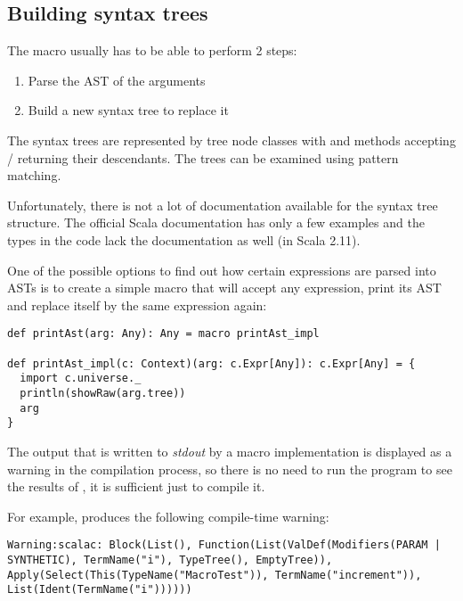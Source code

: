 \subsection{Building syntax trees}
\label{subsec:buildingast}

The macro usually has to be able to perform 2 steps:

\begin{enumerate}
	\item Parse the AST of the arguments
	\item Build a new syntax tree to replace it
\end{enumerate}

The syntax trees are represented by tree node classes with  and  methods accepting / returning their descendants. The trees can be examined using pattern matching.

Unfortunately, there is not a lot of documentation available for the syntax tree structure. The official Scala documentation has only a few examples and the types in the code lack the documentation as well (in Scala 2.11). 


One of the possible options to find out how certain expressions are parsed into ASTs is to create a simple macro that will accept any expression, print its AST and replace itself by the same expression again:

\lstset{style=Scala}
\begin{lstlisting}
def printAst(arg: Any): Any = macro printAst_impl

def printAst_impl(c: Context)(arg: c.Expr[Any]): c.Expr[Any] = {
  import c.universe._
  println(showRaw(arg.tree))
  arg
}
\end{lstlisting}

The output that is written to \textit{stdout} by a macro implementation is displayed as a warning in the compilation process, so there is no need to run the program to see the results of , it is sufficient just to compile it.

For example,  produces the following compile-time warning:

\lstset{style=Dump}
\begin{lstlisting}
Warning:scalac: Block(List(), Function(List(ValDef(Modifiers(PARAM | SYNTHETIC), TermName("i"), TypeTree(), EmptyTree)), Apply(Select(This(TypeName("MacroTest")), TermName("increment")), List(Ident(TermName("i"))))))
\end{lstlisting}


